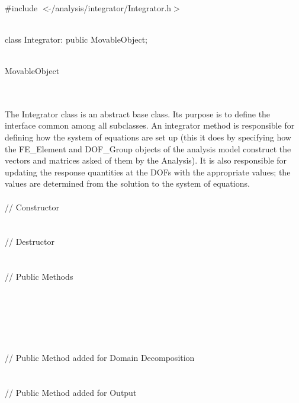 
   \\
\#include $<\tilde{ }$/analysis/integrator/Integrator.h$>$  


  \\
class Integrator: public MovableObject;  


 \\
MovableObject 

\indent{} \\

 \\ 
\indent The Integrator class is an abstract base class. Its purpose is
to define the interface common among all subclasses. An integrator
method is responsible for defining how the system of equations are set
up (this it does by specifying how the FE\_Element and DOF\_Group
objects of the analysis model construct the vectors and matrices asked
of them by the Analysis). It is also responsible for updating the
response quantities at the DOFs with the appropriate values; the values
are determined from the solution to the system of equations. \\

 \\
\indent\indent // Constructor \\
\indent{}\\ \\
\indent\indent // Destructor \\
\indent{}\\  \\
\indent\indent // Public Methods \\
\indent{} \\
\indent{} \\
\indent{} \\
\indent{} \\
\indent{} \\ \\
\indent\indent // Public Method added for Domain Decomposition \\
\indent{} \\ \\
\indent\indent // Public Method added for Output \\
\indent{}\\

